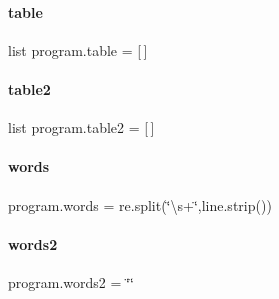 \mbox{\label{namespaceprogram_a6ccdb054d60936fb1dc088f02507e1da}} 
\paragraph{table}
{\footnotesize\ttfamily list program.\+table = [$\,$]}

\mbox{\label{namespaceprogram_aeddcddb2b50f3bd08b9a1cfe2bc932ed}} 
\paragraph{table2}
{\footnotesize\ttfamily list program.\+table2 = [$\,$]}

\mbox{\label{namespaceprogram_ae7ae5900685c39ab4a7b31b6768880a1}} 
\paragraph{words}
{\footnotesize\ttfamily program.\+words = re.\+split(\char`\"{}\textbackslash{}s+\char`\"{},line.\+strip())}

\mbox{\label{namespaceprogram_a9027654dd9ae29764677e06a8f983752}} 
\paragraph{words2}
{\footnotesize\ttfamily program.\+words2 = \char`\"{}\char`\"{}}

